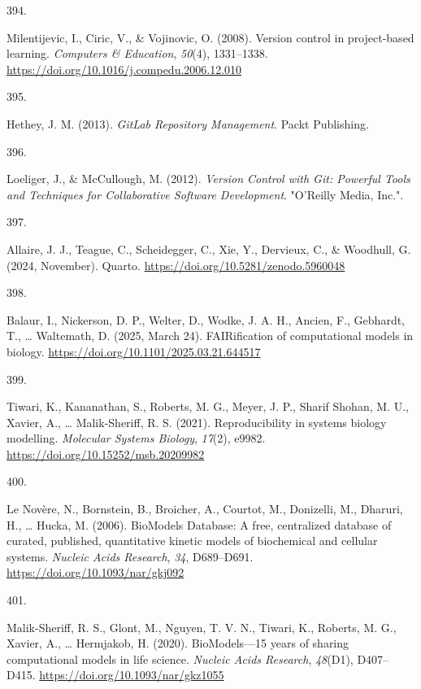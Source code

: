 \documentclass[
  11pt,
  letterpaper,
]{scrreprt}
\newlength{\cslhangindent}
\newlength{\csllabelwidth}
\newenvironment{CSLReferences}[2] %
 {\begin{list}{}{%
  \setlength{\itemindent}{0pt}
  \setlength{\leftmargin}{0pt}
  \setlength{\parsep}{0pt}
  \ifodd #1
   \setlength{\leftmargin}{\cslhangindent}
   \setlength{\itemindent}{-1\cslhangindent}
  \fi
  \setlength{\itemsep}{#2\baselineskip}}}
 {\end{list}}
\newcommand{\CSLLeftMargin}[1]{\parbox[t]{\csllabelwidth}{\strut#1\strut}}
\newcommand{\CSLRightInline}[1]{\parbox[t]{\linewidth - \csllabelwidth}{\strut#1\strut}}
\begin{document}
\begin{CSLReferences}{0}{0}
\CSLLeftMargin{394. }%
\CSLRightInline{Milentijevic, I., Ciric, V., \& Vojinovic, O. (2008).
Version control in project-based learning. \emph{Computers \&
Education}, \emph{50}(4), 1331--1338.
\url{https://doi.org/10.1016/j.compedu.2006.12.010}}

\CSLLeftMargin{395. }%
\CSLRightInline{Hethey, J. M. (2013). \emph{{GitLab Repository
Management}}. Packt Publishing.}

\CSLLeftMargin{396. }%
\CSLRightInline{Loeliger, J., \& McCullough, M. (2012). \emph{Version
{Control} with {Git}: {Powerful Tools} and {Techniques} for
{Collaborative Software Development}}. "O'Reilly Media, Inc.".}

\CSLLeftMargin{397. }%
\CSLRightInline{Allaire, J. J., Teague, C., Scheidegger, C., Xie, Y.,
Dervieux, C., \& Woodhull, G. (2024, November). Quarto.
\url{https://doi.org/10.5281/zenodo.5960048}}

\CSLLeftMargin{398. }%
\CSLRightInline{Balaur, I., Nickerson, D. P., Welter, D., Wodke, J. A.
H., Ancien, F., Gebhardt, T., \ldots{} Waltemath, D. (2025, March 24).
{FAIRification} of computational models in biology.
\url{https://doi.org/10.1101/2025.03.21.644517}}

\CSLLeftMargin{399. }%
\CSLRightInline{Tiwari, K., Kananathan, S., Roberts, M. G., Meyer, J.
P., Sharif Shohan, M. U., Xavier, A., \ldots{} Malik-Sheriff, R. S.
(2021). Reproducibility in systems biology modelling. \emph{Molecular
Systems Biology}, \emph{17}(2), e9982.
\url{https://doi.org/10.15252/msb.20209982}}

\CSLLeftMargin{400. }%
\CSLRightInline{Le Novère, N., Bornstein, B., Broicher, A., Courtot, M.,
Donizelli, M., Dharuri, H., \ldots{} Hucka, M. (2006). {BioModels
Database}: A free, centralized database of curated, published,
quantitative kinetic models of biochemical and cellular systems.
\emph{Nucleic Acids Research}, \emph{34}, D689--D691.
\url{https://doi.org/10.1093/nar/gkj092}}

\CSLLeftMargin{401. }%
\CSLRightInline{Malik-Sheriff, R. S., Glont, M., Nguyen, T. V. N.,
Tiwari, K., Roberts, M. G., Xavier, A., \ldots{} Hermjakob, H. (2020).
{BioModels}---15 years of sharing computational models in life science.
\emph{Nucleic Acids Research}, \emph{48}(D1), D407--D415.
\url{https://doi.org/10.1093/nar/gkz1055}}


\end{CSLReferences}
\end{document}

